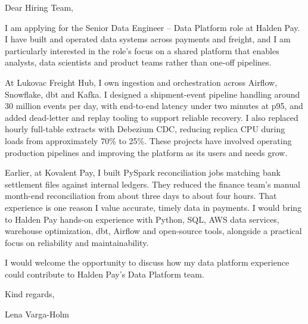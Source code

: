 \documentclass[11pt,a4paper]{article}
\begin{document}
Dear Hiring Team,

I am applying for the Senior Data Engineer -- Data Platform role at Halden Pay. I have built and operated data systems across payments and freight, and I am particularly interested in the role’s focus on a shared platform that enables analysts, data scientists and product teams rather than one-off pipelines.

At Lukovac Freight Hub, I own ingestion and orchestration across Airflow, Snowflake, dbt and Kafka. I designed a shipment-event pipeline handling around 30 million events per day, with end-to-end latency under two minutes at p95, and added dead-letter and replay tooling to support reliable recovery. I also replaced hourly full-table extracts with Debezium CDC, reducing replica CPU during loads from approximately 70\% to 25\%. These projects have involved operating production pipelines and improving the platform as its users and needs grow.

Earlier, at Kovalent Pay, I built PySpark reconciliation jobs matching bank settlement files against internal ledgers. They reduced the finance team’s manual month-end reconciliation from about three days to about four hours. That experience is one reason I value accurate, timely data in payments. I would bring to Halden Pay hands-on experience with Python, SQL, AWS data services, warehouse optimization, dbt, Airflow and open-source tools, alongside a practical focus on reliability and maintainability.

I would welcome the opportunity to discuss how my data platform experience could contribute to Halden Pay’s Data Platform team.

Kind regards,

Lena Varga-Holm
\end{document}

